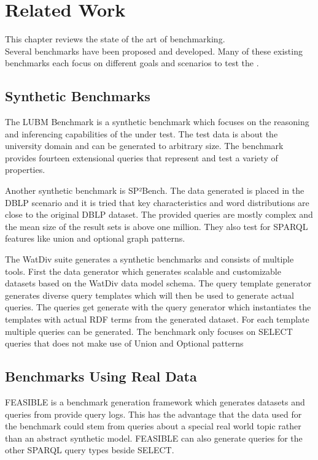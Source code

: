 \chapter{Related Work}
\label{ch:related_work}

This chapter reviews the state of the art of \ts{} benchmarking.\\

Several benchmarks have been proposed and developed.
Many of these existing benchmarks each focus on different goals and scenarios to test the \tsp{}.

\section{Synthetic Benchmarks}
\label{sec:synthetic_benchmarks}
The LUBM Benchmark\cite{guoLUBMBenchmarkOWL2005} is a synthetic benchmark which focuses on the reasoning and inferencing capabilities of the \tsp{} under test.
The test data is about the university domain and can be generated to arbitrary size.
The benchmark provides fourteen extensional queries that represent and test a variety of properties.

Another synthetic benchmark is SP²Bench\cite{schmidtSP2BenchSPARQLPerformance2008}.
The data generated is placed in the DBLP scenario and it is tried that key characteristics and word distributions are close to the original DBLP dataset.
The provided queries are mostly complex and the mean size of the result sets is above one million\cite{saleemFEASIBLEFeatureBasedSPARQL2015}.
They also test for SPARQL features like union and optional graph patterns.

The WatDiv suite generates a synthetic benchmarks and consists of multiple tools\cite{alucDiversifiedStressTesting2014}.
First the data generator which generates scalable and customizable datasets based on the WatDiv data model schema.
The query template generator generates diverse query templates which will then be used to generate actual queries.
The queries get generate with the query generator which instantiates the templates with actual RDF terms from the generated dataset.
For each template multiple queries can be generated.
The benchmark only focuses on SELECT queries that does not make use of Union and Optional patterns

\section{Benchmarks Using Real Data}
\label{sec:benchmarks_real_data}
FEASIBLE is a benchmark generation framework which generates datasets and queries from provide query logs\cite{saleemFEASIBLEFeatureBasedSPARQL2015}.
This has the advantage that the data used for the benchmark could stem from queries about a special real world topic rather than an abstract synthetic model.
FEASIBLE can also generate queries for the other SPARQL query types beside SELECT.

